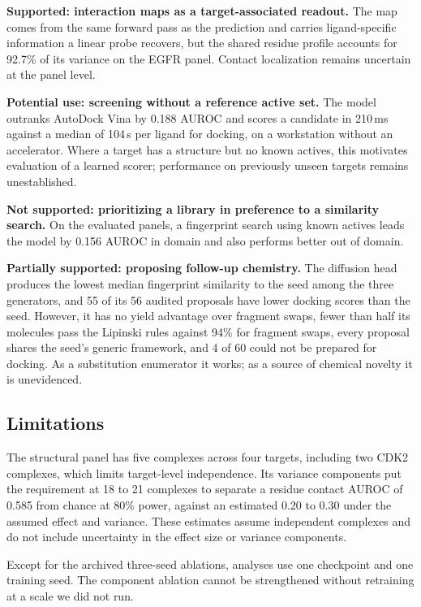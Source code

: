 \documentclass{ieeeaccess}
\begin{document}
\textbf{Supported: interaction maps as a target-associated readout.} The map comes
from the same forward pass as the prediction and carries ligand-specific
information a linear probe recovers, but the shared residue profile accounts
for 92.7\% of its variance on the EGFR panel. Contact localization remains uncertain at the panel level.

\textbf{Potential use: screening without a reference active set.} The model outranks
AutoDock Vina by 0.188 AUROC and scores a candidate in 210\,ms against a median
of 104\,s per ligand for docking, on a workstation without an accelerator. Where a target has a
structure but no known actives, this motivates evaluation of a learned scorer;
performance on previously unseen targets remains unestablished.

\textbf{Not supported: prioritizing a library in preference to a similarity
search.} On the evaluated panels, a fingerprint search using known actives
leads the model by 0.156 AUROC in domain and also performs better out of domain.

\textbf{Partially supported: proposing follow-up chemistry.} The diffusion head
produces the lowest median fingerprint similarity to the seed among the three
generators, and 55 of its 56 audited proposals have lower docking scores than
the seed. However, it has no
yield advantage over fragment swaps, fewer than half its molecules pass the
Lipinski rules against 94\% for fragment swaps, every proposal shares the seed's
generic framework, and 4 of 60 could not be prepared for docking. As a
substitution enumerator it works; as a source of chemical novelty it is
unevidenced.

\subsection{Limitations}
The structural panel has five complexes across four targets, including two
CDK2 complexes, which limits target-level independence. Its variance components put the
requirement at 18 to 21 complexes to separate a residue contact AUROC of 0.585
from chance at 80\% power, against an estimated 0.20 to 0.30 under the assumed
effect and variance. These estimates assume independent complexes and do not include uncertainty
in the effect size or variance components.

Except for the archived three-seed ablations, analyses use one checkpoint and
one training seed. The component ablation cannot be strengthened
without retraining at a scale we did not run.
\end{document}
